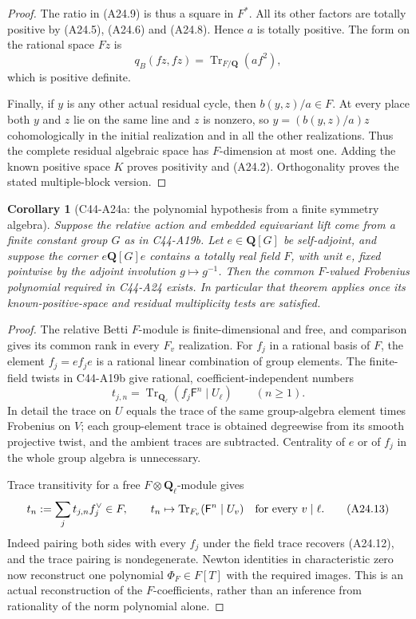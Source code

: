 \documentclass[11pt]{article}
\newtheorem{corollary}[theorem]{Corollary}
\theoremstyle{remark}\newtheorem{remark}[theorem]{Remark}
\begin{document}
\begin{proof}
The ratio in (A24.9) is thus a square in $F^*$.  All its other factors
are totally positive by (A24.5), (A24.6) and (A24.8).  Hence $a$ is
totally positive.  The form on the rational space $Fz$ is
\[
                          q_B(fz,fz)
                            =\operatorname{Tr}_{F/\mathbf Q}(a f^2),
 \tag{A24.11}
\]
which is positive definite.

Finally, if $y$ is any other actual residual cycle, then
$b(y,z)/a\in F$.  At every place both $y$ and $z$ lie on the same
line and $z$ is nonzero, so
$y=(b(y,z)/a)z$ cohomologically in the initial realization and in all
the other realizations.  Thus the complete residual algebraic space
has $F$-dimension at most one.  Adding the known positive space $K$
proves positivity and (A24.2).  Orthogonality proves the stated
multiple-block version.
\end{proof}

\begin{corollary}[C44-A24a: the polynomial hypothesis from a finite symmetry algebra]
Suppose the relative action and embedded equivariant lift come from
a finite constant group $G$ as in C44-A19b.  Let $e\in\mathbf Q[G]$
be self-adjoint, and suppose the corner $e\mathbf Q[G]e$ contains a
totally real field $F$, with unit $e$, fixed pointwise by the adjoint
involution $g\mapsto g^{-1}$.  Then the common $F$-valued Frobenius
polynomial required in C44-A24 exists.  In particular that theorem
applies once its known-positive-space and residual multiplicity tests
are satisfied.
\end{corollary}

\begin{proof}
The relative Betti $F$-module is finite-dimensional and free, and
comparison gives its common rank in every $F_v$ realization.
For $f_j$ in a rational basis of $F$, the element $f_j=e f_j e$ is a
rational linear combination of group elements.  The finite-field
twists in C44-A19b give rational, coefficient-independent numbers
\[
             t_{j,n}=\operatorname{Tr}_{\mathbf Q_\ell}
                       (f_j\mathsf F^n\mid U_\ell)
                         \qquad(n\geq1).
 \tag{A24.12}
\]
In detail the trace on $U$ equals the trace of the same group-algebra
element times Frobenius on $V$; each group-element trace is obtained
degreewise from its smooth projective twist, and the ambient traces
are subtracted.  Centrality of $e$ or of $f_j$ in the whole group
algebra is unnecessary.

Trace transitivity for a free $F\otimes\mathbf Q_\ell$-module gives
\[
      t_n:=\sum_jt_{j,n}f_j^\vee\in F,
       \qquad t_n\mapsto\operatorname{Tr}_{F_v}
                              (\mathsf F^n\mid U_v)
                                  \quad\hbox{for every }v\mid\ell.
 \tag{A24.13}
\]
Indeed pairing both sides with every $f_j$ under the field trace
recovers (A24.12), and the trace pairing is nondegenerate.
Newton identities in characteristic zero now reconstruct one
polynomial $\Phi_F\in F[T]$ with the required images.  This is an
actual reconstruction of the $F$-coefficients, rather than an
inference from rationality of the norm polynomial alone.
\end{proof}
\end{document}
